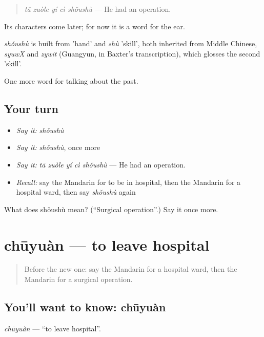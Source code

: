 \begin{quote}
\emph{tā zuòle yí cì shǒushù} — He had an operation.
\end{quote}

Its characters come later; for now it is a word for the ear.

\begin{cousinweb}
\emph{shǒushù} is built from  'hand' and \emph{shù} 'skill', both inherited from Middle Chinese, \emph{syuwX} and \emph{zywit} (Guangyun, in Baxter's transcription), which glosses the second 'skill'.
\end{cousinweb}

\begin{grammarlens}[title={What you've built}]
One more word for talking about the past.
\end{grammarlens}

\subsection*{Your turn}
\begin{itemize}
\raggedright
  \item \emph{Say it:} \emph{shǒushù}
  \item \emph{Say it:} \emph{shǒushù}, once more
  \item \emph{Say it:} \emph{tā zuòle yí cì shǒushù} — He had an operation.
  \item \emph{Recall:} say the Mandarin for to be in hospital, then the Mandarin for a hospital ward, then say \emph{shǒushù} again
\end{itemize}

\begin{tcolorbox}[breakable,colback=teal!4,colframe=teal!35!black,title={Before you move on}]
What does shǒushù mean? (\textquotedblleft{}Surgical operation\textquotedblright{}.) Say it once more.
\end{tcolorbox}
\section[chūyuàn]{chūyuàn — to leave hospital}

\label{lesson:ZH-C241-chuyuan}



\begin{quote}
Before the new one: say the Mandarin for a hospital ward, then the Mandarin for a surgical operation.
\end{quote}

\subsection*{You'll want to know: chūyuàn}
\emph{chūyuàn} — \textquotedblleft{}to leave hospital\textquotedblright{}.

